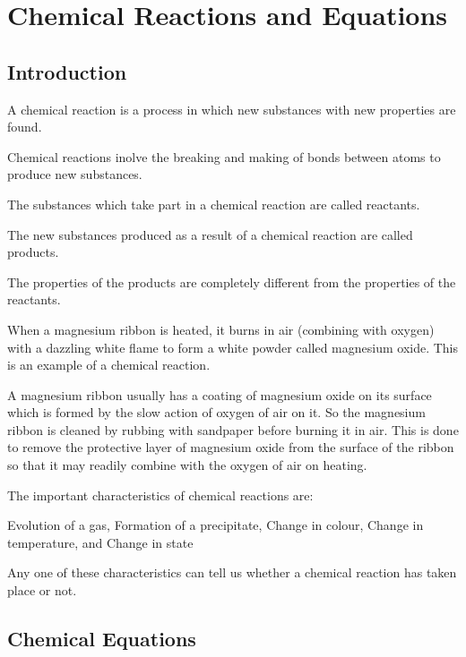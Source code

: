 \chapter{Chemical Reactions and Equations}

\section{Introduction}

\begin{outline}

    \1 A chemical reaction is a process in which new substances with new properties are found.

    \1 Chemical reactions inolve the breaking and making of bonds between atoms to produce new substances.

    \1 The substances which take part in a chemical reaction are called reactants.

    \1 The new substances produced as a result of a chemical reaction are called products.

    \1 The properties of the products are completely different from the properties of the reactants.

    \1 When a magnesium ribbon is heated, it burns in air (combining with oxygen) with a dazzling white flame to form a white powder called magnesium oxide. This is an example of a chemical reaction.

    \1 A magnesium ribbon usually has a coating of magnesium oxide on its surface which is formed by the slow action of oxygen of air on it. So the magnesium ribbon is cleaned by rubbing with sandpaper before burning it in air. This is done to remove the protective layer of magnesium oxide from the surface of the ribbon so that it may readily combine with the oxygen of air on heating.

    \1 The important characteristics of chemical reactions are:

    \2 Evolution of a gas,
    \2 Formation of a precipitate,
    \2 Change in colour,
    \2 Change in temperature, and
    \2 Change in state

    Any one of these characteristics can tell us whether a chemical reaction has taken place or not.

\end{outline}

\section{Chemical Equations}

